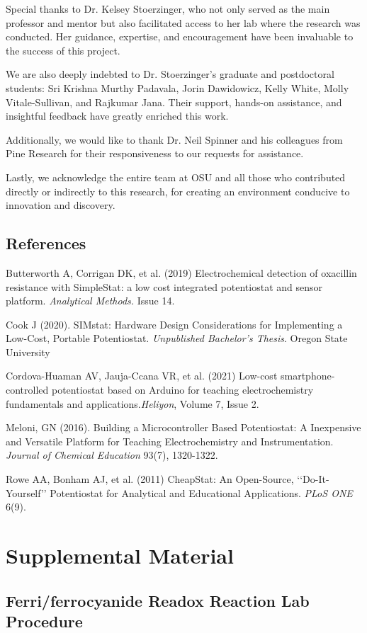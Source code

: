 \documentclass{article}
\begin{document}
Special thanks to Dr. Kelsey Stoerzinger, who not only served as the main professor and mentor but also facilitated access to her lab where the research was conducted. Her guidance, expertise, and encouragement have been invaluable to the success of this project.


We are also deeply indebted to Dr. Stoerzinger's graduate and postdoctoral students: Sri Krishna Murthy Padavala, Jorin Dawidowicz, Kelly White, Molly Vitale-Sullivan, and Rajkumar Jana. Their support, hands-on assistance, and insightful feedback have greatly enriched this work.

Additionally, we would like to thank Dr. Neil Spinner and his colleagues from Pine Research for their responsiveness to our requests for assistance. 

Lastly, we acknowledge the entire team at OSU and all those who contributed directly or indirectly to this research, for creating an environment conducive to innovation and discovery.

\newpage
\subsection*{References}
Butterworth A, Corrigan DK, et al. (2019) Electrochemical detection of oxacillin resistance with SimpleStat: a low cost integrated potentiostat and sensor platform. \emph{Analytical Methods.} Issue 14.


Cook J (2020). SIMstat: Hardware Design Considerations for Implementing a Low-Cost, Portable Potentiostat. \emph{Unpublished Bachelor's Thesis}. Oregon State University


Cordova-Huaman AV, Jauja-Ccana VR, et al. (2021) Low-cost smartphone-controlled potentiostat based on Arduino for teaching electrochemistry fundamentals and applications.\emph{Heliyon}, Volume 7, Issue 2.


Meloni, GN (2016). Building a Microcontroller Based Potentiostat: A Inexpensive and Versatile Platform for Teaching Electrochemistry and Instrumentation. \emph{Journal of Chemical Education} 93(7), 1320-1322.


Rowe AA, Bonham AJ, et al. (2011) CheapStat: An Open-Source, ‘‘Do-It-Yourself’’ Potentiostat for Analytical and Educational Applications. \emph{PLoS ONE} 6(9).


\newpage
\section*{Supplemental Material}
\subsection*{Ferri/ferrocyanide Readox Reaction Lab Procedure}
\end{document}
